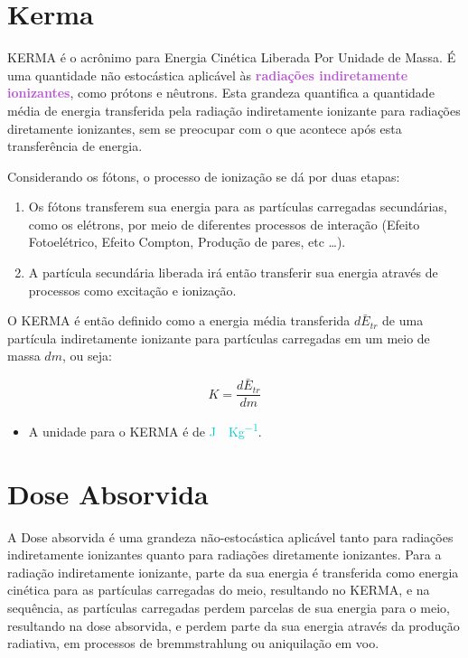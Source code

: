 \documentclass[11pt,a4paper]{article}
\newcounter{exemplo}
\begin{document}
	\section{Kerma}

		KERMA é o acrônimo para Energia Cinética Liberada Por Unidade de Massa. É uma quantidade não estocástica aplicável às \textcolor{MediumOrchid}{\textbf{radiações indiretamente ionizantes}}, como prótons e nêutrons. Esta grandeza quantifica a quantidade média de energia transferida pela radiação indiretamente ionizante para radiações diretamente ionizantes, sem se preocupar com o que acontece após esta transferência de energia. 

		Considerando os fótons, o processo de ionização se dá por duas etapas: 

			\begin{enumerate}[label=\textcolor{CarnationPink}{\arabic*${}^\circ$}]
				\item Os fótons transferem sua energia para as partículas carregadas secundárias, como os elétrons, por meio de diferentes processos de interação (Efeito Fotoelétrico, Efeito Compton, Produção de pares, etc \dots).
				
				\item A partícula secundária liberada irá então transferir sua energia através de processos como excitação e ionização. 
			\end{enumerate}

		O KERMA é então definido como a energia média transferida $d\bar{E}_{tr}$ de uma partícula indiretamente ionizante para partículas carregadas em um meio de massa $dm$, ou seja:

			\begin{equation}
				K = \frac{d \bar{E}_{tr}}{d m}
			\end{equation}
		
		\begin{exemplo}[Unidade]
			\begin{itemize}
				\item A unidade para o KERMA é de \textcolor{DarkTurquoise}{\unit{J \cdot Kg^{-1}}}.
			\end{itemize}
		\end{exemplo}
		


	\section{Dose Absorvida}

		A Dose absorvida é uma grandeza não-estocástica aplicável tanto para radiações indiretamente ionizantes quanto para radiações diretamente ionizantes. Para a radiação indiretamente ionizante, parte da sua energia é transferida como energia cinética para as partículas carregadas do meio, resultando no KERMA, e na sequência, as partículas carregadas perdem parcelas de sua energia para o meio, resultando na dose absorvida, e perdem parte da sua energia através da produção radiativa, em processos de bremmstrahlung ou aniquilação em voo. 
		
\end{document}
